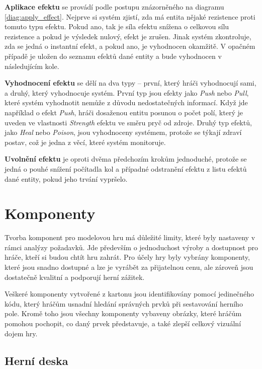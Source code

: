\textbf{Aplikace efektu} se provádí podle postupu znázorněného na diagramu \ref{diag:apply_effect}. Nejprve si systém zjistí, zda má entita nějaké rezistence proti tomuto typu efektu. Pokud ano, tak je síla efektu snížena o celkovou sílu rezistence a pokud je výsledek nulový, efekt je zrušen. Jinak systém zkontroluje, zda se jedná o instantní efekt, a pokud ano, je vyhodnocen okamžitě. V opačném případě je uložen do seznamu efektů dané entity a bude vyhodnocen v následujícím kole.

\textbf{Vyhodnocení efektu} se dělí na dva typy -- první, který hráči vyhodnocují sami, a druhý, který vyhodnocuje systém. První typ jsou efekty jako \textit{Push} nebo \textit{Pull}, které systém vyhodnotit nemůže z důvodu nedostatečných informací. Když jde například o efekt \textit{Push}, hráči dosaženou entitu posunou o počet polí, který je uveden ve vlastnosti \textit{Strength} efektu ve směru pryč od zdroje. Druhý typ efektů, jako \textit{Heal} nebo \textit{Poison}, jsou vyhodnoceny systémem, protože se týkají zdraví postav, což je jedna z věcí, které systém monitoruje.

\textbf{Uvolnění efektu} je oproti dvěma předchozím krokům jednoduché, protože se jedná o pouhé snížení počítadla kol a případné odstranění efektu z listu efektů dané entity, pokud jeho trvání vypršelo.


\section{Komponenty}
\label{sec:design_components}

Tvorba komponent pro modelovou hru má důležité limity, které byly nastaveny v rámci analýzy požadavků. Jde především o jednoduchost výroby a dostupnost pro hráče, kteří si budou chtít hru zahrát. Pro účely hry byly vybrány komponenty, které jsou snadno dostupné a lze je vyrábět za přijatelnou cenu, ale zároveň jsou dostatečně kvalitní a podporují herní zážitek.

Veškeré komponenty vytvořené z kartonu jsou identifikovány pomocí jedinečného kódu, který hráčům usnadní hledání správných prvků při sestavování herního pole. Kromě toho jsou všechny komponenty vybaveny obrázky, které hráčům pomohou pochopit, co daný prvek představuje, a také zlepší celkový vizuální dojem hry.

\subsection{Herní deska}
\label{subsec:design_board}

